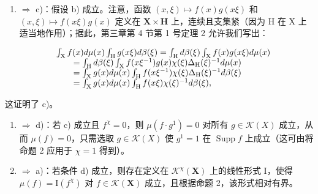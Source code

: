 \begin{enumerate}
\def\labelenumi{\alph{enumi})}
\setcounter{enumi}{1}
\tightlist
\item
  \(\Rightarrow\) c)：假设 b) 成立。注意，函数 \((x,\xi)\mapsto f(x)g(x\xi)\) 和 \((x,\xi)\mapsto f(x\xi)g(x)\) 定义在 \(\mathbf{X}\times\mathbf{H}\) 上，连续且支集紧（因为 H 在 X 上适当地作用）；据此，第三章第 4 节第 1 号定理 2 允许我们写出：
\end{enumerate}

\[
\begin{array}{r l} & {\int_ {\mathrm{X}} f (x) d \mu (x) \int_ {\mathrm{H}} g (x \xi) d \beta (\xi) = \int_ {\mathrm{H}} d \beta (\xi) \int_ {\mathrm{X}} f (x) g (x \xi) d \mu (x)} \\ & {\qquad = \int_ {\mathrm{H}} d \beta (\xi) \int_ {\mathrm{X}} f (x \xi^ {- 1}) g (x) \chi (\xi) \Delta_ {\mathrm{H}} (\xi) ^ {- 1} d \mu (x)} \\ & {\qquad = \int_ {\mathrm{X}} g (x) d \mu (x) \int_ {\mathrm{H}} f (x \xi^ {- 1}) \chi (\xi) \Delta_ {\mathrm{H}} (\xi) ^ {- 1} d \beta (\xi)} \\ & {\qquad = \int_ {\mathrm{X}} g (x) d \mu (x) \int_ {\mathrm{H}} f (x \xi) \chi (\xi) ^ {- 1} d \beta (\xi),} \end{array}
\]

这证明了 c)。

\begin{enumerate}
\def\labelenumi{\alph{enumi})}
\setcounter{enumi}{2}
\item
  \(\Rightarrow\) d)：若 c) 成立且 \(f^{\chi} = 0\)，则 \(\mu(f \cdot g^{1}) = 0\) 对所有 \(g \in \mathcal{K}(X)\) 成立，从而 \(\mu(f) = 0\)，只需选取 \(g \in \mathcal{K}(X)\) 使 \(g^{1} = 1\) 在 \(\operatorname{Supp} f\) 上成立（这可由将命题 2 应用于 \(\chi = 1\) 得到）。
\item
  \(\Rightarrow\) a)：若条件 d) 成立，则存在定义在 \(\mathcal{K}^{\chi}(\mathbf{X})\) 上的线性形式 I，使得 \(\mu(f) = \mathrm{I}(f^{\chi})\) 对 \(f \in \mathcal{K}(\mathbf{X})\) 成立，且根据命题 2，该形式相对有界。
\end{enumerate}

